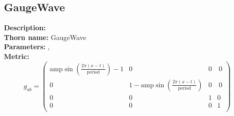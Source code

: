 
\subsection{GaugeWave}
{\bf Description:}   \\
{\bf Thorn name:} GaugeWave \\
{\bf Parameters:} ,  \\
{\bf Metric:} \\
\begin{equation}
g_{ab} = 
\left(
\begin{array}{cccc}
 \text{amp} \sin \left(\frac{2 \pi  (x-t)}{\text{period}}\right)-1 & 0 & 0 & \
0 \\
 0 & 1-\text{amp} \sin \left(\frac{2 \pi  (x-t)}{\text{period}}\right) & 0 & \
0 \\
 0 & 0 & 1 & 0 \\
 0 & 0 & 0 & 1 \\
\end{array}
\right)
\end{equation}


